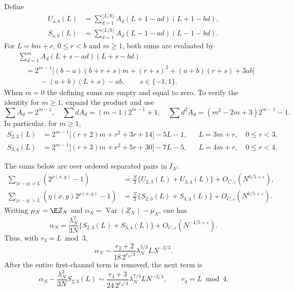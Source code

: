 Define
\begin{align*}
 U_{a,b}(L)&=\sum_{d=1}^{\lfloor L/b\rfloor}
            A_d(L+1-ad)(L+1-bd),\\
 S_{a,b}(L)&=\sum_{d=1}^{\lfloor L/b\rfloor}
            A_d(L-1-ad)(L-1-bd).
\end{align*}
For $L=bm+r$, $0\leq r<b$ and $m\geq1$, both sums are evaluated by
\begin{equation}\label{p1:arith:channelidentity}
 \begin{split}
 &\sum_{d=1}^{m}A_d(L+s-ad)(L+s-bd)\\
 &\quad=2^{m-1}\big[(b-a)(b+r+s)m+(r+s)^2
                   +(a+b)(r+s)+3ab\big]\\
 &\qquad\quad -(a+b)(L+s)-ab,\qquad s\in\{-1,1\}.
 \end{split}
\end{equation}
When $m=0$ the defining sums are empty and equal to zero.
To verify the identity for $m\geq1$, expand the product and use
\[
 \sum A_d=2^{m-1},\quad
 \sum dA_d=(m-1)2^{m-1}+1,\quad
 \sum d^2A_d=(m^2-2m+3)2^{m-1}-1.
\]
In particular, for $m\geq1$,
\begin{align}
 S_{2,3}(L)&=2^{m-1}\big[(r+2)m+r^2+3r+14\big]-5L-1,
       &&L=3m+r,\quad0\leq r<3,\label{p1:arith:S23}\\
 S_{3,4}(L)&=2^{m-1}\big[(r+3)m+r^2+5r+30\big]-7L-5,
       &&L=4m+r,\quad0\leq r<4.\label{p1:arith:S34}
\end{align}

\begin{theorem}\label{p1:arith:pairs}
The sums below are over ordered separated pairs in $I_N$:
\begin{align}
 \sum_{|x-y|>L}(2^{\rho(x,y)}-1)
 &=\frac N3\{U_{2,3}(L)+U_{3,4}(L)\}
      +O_{C,\varepsilon}(N^{6/5+\varepsilon}),\label{p1:arith:positiveprofile}\\
 \sum_{|x-y|>L}(\eta(x,y)2^{\rho(x,y)}-1)
 &=\frac N3\{S_{2,3}(L)+S_{3,4}(L)\}
      +O_{C,\varepsilon}(N^{6/5+\varepsilon}).\label{p1:arith:signedprofile}
\end{align}
Writing $\mu_N=\E Z_N$ and $\alpha_N=\operatorname{Var}(Z_N)-\mu_N$, one has
\begin{equation}\label{p1:arith:cumulantexpansion}
 \alpha_N=\frac{\lambda_N^2}{3N}\{S_{2,3}(L)+S_{3,4}(L)\}
            +O_{C,\varepsilon}(N^{-4/5+\varepsilon}).
\end{equation}
Thus, with $r_3=L\bmod3$,
\begin{equation}\label{p1:arith:leadingphase}
 \alpha_N\sim
 \frac{r_3+2}{18\,2^{r_3/3}}\lambda_N^{5/3}L N^{-2/3}.
\end{equation}
After the entire first-channel term is removed, the next term is
\begin{equation}\label{p1:arith:secondphase}
 \alpha_N-\frac{\lambda_N^2}{3N}S_{2,3}(L)
 \sim\frac{r_4+3}{24\,2^{r_4/4}}\lambda_N^{7/4}L N^{-3/4},
 \qquad r_4=L\bmod4.
\end{equation}
\end{theorem}

